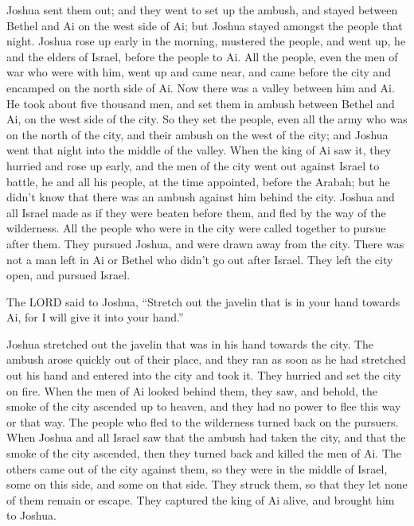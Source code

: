  Joshua sent them out; and they went to set up the ambush,
and stayed between Bethel and Ai on the west side of Ai; but Joshua
stayed amongst the people that night.  Joshua rose up
early in the morning, mustered the people, and went up, he and the
elders of Israel, before the people to Ai.  All the
people, even the men of war who were with him, went up and came near,
and came before the city and encamped on the north side of Ai. Now there
was a valley between him and Ai.  He took about five
thousand men, and set them in ambush between Bethel and Ai, on the west
side of the city.  So they set the people, even all the
army who was on the north of the city, and their ambush on the west of
the city; and Joshua went that night into the middle of the valley.
 When the king of Ai saw it, they hurried and rose up
early, and the men of the city went out against Israel to battle, he and
all his people, at the time appointed, before the Arabah; but he didn't
know that there was an ambush against him behind the city.
 Joshua and all Israel made as if they were beaten before
them, and fled by the way of the wilderness.  All the
people who were in the city were called together to pursue after them.
They pursued Joshua, and were drawn away from the city. 
There was not a man left in Ai or Bethel who didn't go out after Israel.
They left the city open, and pursued Israel.

 The LORD said to Joshua, ``Stretch out the javelin that
is in your hand towards Ai, for I will give it into your hand.''

Joshua stretched out the javelin that was in his hand towards the city.
 The ambush arose quickly out of their place, and they
ran as soon as he had stretched out his hand and entered into the city
and took it. They hurried and set the city on fire.  When
the men of Ai looked behind them, they saw, and behold, the smoke of the
city ascended up to heaven, and they had no power to flee this way or
that way. The people who fled to the wilderness turned back on the
pursuers.  When Joshua and all Israel saw that the ambush
had taken the city, and that the smoke of the city ascended, then they
turned back and killed the men of Ai.  The others came
out of the city against them, so they were in the middle of Israel, some
on this side, and some on that side. They struck them, so that they let
none of them remain or escape.  They captured the king of
Ai alive, and brought him to Joshua.

